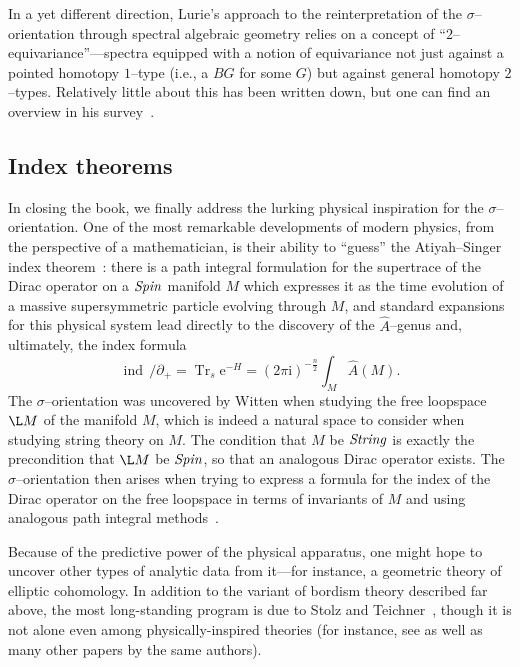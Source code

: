 In a yet different direction, Lurie's approach to the reinterpretation of the \(\sigma\)--orientation through spectral algebraic geometry relies on a concept of ``\(2\)--equivariance''---spectra equipped with a notion of equivariance not just against a pointed homotopy \(1\)--type (i.e., a \(BG\) for some \(G\)) but against general homotopy \(2\)--types.  Relatively little about this has been written down, but one can find an overview in his survey~\cite[Section 5.3]{LurieSurveyOfEll}.



\subsection*{Index theorems}

In closing the book, we finally address the lurking physical inspiration for the \(\sigma\)--orientation.  One of the most remarkable developments of modern physics, from the perspective of a mathematician, is their ability to ``guess'' the Atiyah--Singer index theorem~\cite[Section 8.6]{Takhtajan}: there is a path integral formulation for the supertrace of the Dirac operator on a \(\mathit{Spin}\) manifold \(M\) which expresses it as the time evolution of a massive supersymmetric particle evolving through \(M\), and standard expansions for this physical system lead directly to the discovery of the \(\widehat A\)--genus and, ultimately, the index formula \[\operatorname{ind}\, /\!\!\!\partial_+ = \operatorname{Tr}_s \mathrm e^{-H} = (2 \pi \mathrm i)^{-\frac{n}{2}} \int_M \widehat A(M).\]  The \(\sigma\)--orientation was uncovered by Witten when studying the free loopspace \(\L M\) of the manifold \(M\), which is indeed a natural space to consider when studying string theory on \(M\).  The condition that \(M\) be \(\mathit{String}\) is exactly the precondition that \(\L M\) be \(\mathit{Spin}\), so that an analogous Dirac operator exists.  The \(\sigma\)--orientation then arises when trying to express a formula for the index of the Dirac operator on the free loopspace in terms of invariants of \(M\) and using analogous path integral methods~\cite{SegalEll}.

Because of the predictive power of the physical apparatus, one might hope to uncover other types of analytic data from it---for instance, a geometric theory of elliptic cohomology.  In addition to the variant of bordism theory described far above, the most long-standing program is due to Stolz and Teichner~\cite{StolzTeichnerWhatIs,StolzTeichnerSusy}, though it is not alone even among physically-inspired theories (for instance, see \cite{DouglasHenriques} as well as many other papers by the same authors).

